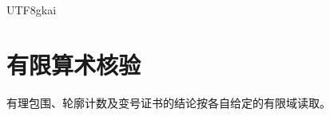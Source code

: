 \documentclass[12pt]{article}
\theoremstyle{definition}
\theoremstyle{remark}
\begin{document}
\begin{CJK*}{UTF8}{gkai}
\setcounter{tocdepth}{2}
\clearpage
\tableofcontents
\clearpage






\appendix

\section{有限算术核验}
\label{sec:finite-zeta-verification}
有理包围、轮廓计数及变号证书的结论按各自给定的有限域读取。



\end{CJK*}
\end{document}
